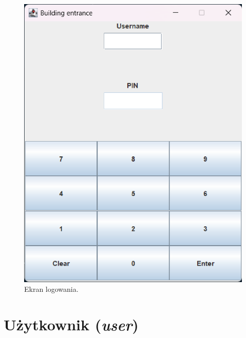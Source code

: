\begin{figure}[H]
    \centering
    \includegraphics[width=\textwidth,height=0.5\textheight,keepaspectratio]{figures/app-images/panel-logowania.eps}
    \caption{Ekran logowania. \cite{SwingLayouts} \label{fig8}}
\end{figure}

\newpage
\section{Użytkownik (\textit{user})}
